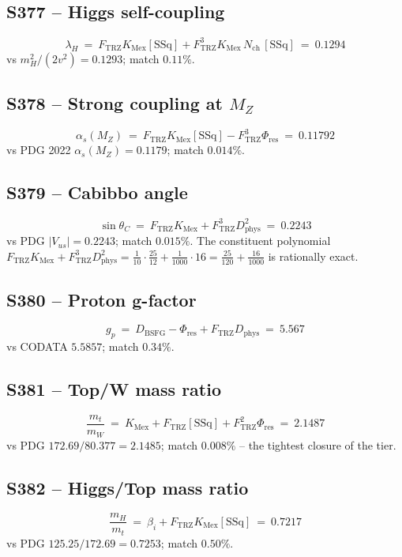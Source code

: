 \documentclass[11pt]{article}
\newcommand{\Ftrz}{F_{\mathrm{TRZ}}}
\newcommand{\Phires}{\Phi_{\mathrm{res}}}
\newcommand{\KMex}{K_{\mathrm{Mex}}}
\newcommand{\Dphys}{D_{\mathrm{phys}}}
\newcommand{\Dbsfg}{D_{\mathrm{BSFG}}}
\newcommand{\Nch}{N_{\mathrm{ch}}}
\newcommand{\bii}{\beta_i}
\newcommand{\SSq}{[\mathrm{SSq}]}
\begin{document}
\subsection{S377 -- Higgs self-coupling}
\[
\lambda_H\ =\ \Ftrz\KMex\SSq+\Ftrz^{3}\KMex\,\Nch\,\SSq\ =\ 0.1294
\]
vs $m_H^{2}/(2v^{2})=0.1293$; match $\mathbf{0.11\%}$.

\subsection{S378 -- Strong coupling at $M_Z$}
\[
\alpha_s(M_Z)\ =\ \Ftrz\KMex\SSq-\Ftrz^{3}\Phires\ =\ 0.11792
\]
vs PDG 2022 $\alpha_s(M_Z)=0.1179$; match $\mathbf{0.014\%}$.

\subsection{S379 -- Cabibbo angle}
\[
\sin\theta_C\ =\ \Ftrz\KMex+\Ftrz^{3}\Dphys^{2}\ =\ 0.2243
\]
vs PDG $|V_{us}|=0.2243$; match $\mathbf{0.015\%}$.  The constituent
polynomial $\Ftrz\KMex+\Ftrz^{3}\Dphys^{2}=
\tfrac{1}{10}\cdot\tfrac{25}{12}+\tfrac{1}{1000}\cdot 16
=\tfrac{25}{120}+\tfrac{16}{1000}$ is rationally exact.

\subsection{S380 -- Proton g-factor}
\[
g_p\ =\ \Dbsfg-\Phires+\Ftrz\Dphys\ =\ 5.567
\]
vs CODATA $5.5857$; match $0.34\%$.

\subsection{S381 -- Top/W mass ratio}
\[
\frac{m_t}{m_W}\ =\ \KMex+\Ftrz\SSq+\Ftrz^{2}\Phires\ =\ 2.1487
\]
vs PDG $172.69/80.377=2.1485$; match $\mathbf{0.008\%}$ -- the
tightest closure of the tier.

\subsection{S382 -- Higgs/Top mass ratio}
\[
\frac{m_H}{m_t}\ =\ \bii+\Ftrz\KMex\SSq\ =\ 0.7217
\]
vs PDG $125.25/172.69=0.7253$; match $0.50\%$.
\end{document}
